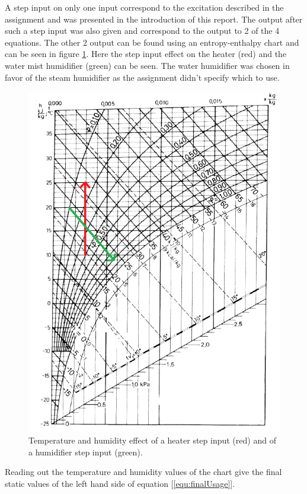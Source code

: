 \documentclass[a4paper, titlepage]{article}
\begin{document}
A step input on only one input correspond to the excitation described in the assignment and was presented in the introduction of this report.
The output after such a step input was also given and correspond to the output to 2 of the 4 equations.
The other 2 output can be found using an entropy-enthalpy chart and can be seen in figure \ref{fig:entropy}.
Here the step input effect on the heater (red) and the water mist humidifier (green) can be seen.
The water humidifier was chosen in favor of the steam humidifier as the assignment didn't specify which to use.

\begin{figure}
\center
\includegraphics[scale=0.7]{../figures/enthalpyEntropy.png}
\caption{Temperature and humidity effect of a heater step input (red) and of a humidifier step input (green).}
\label{fig:entropy}
\end{figure}

Reading out the temperature and humidity values of the chart give the final static values of the left hand side of equation [\ref{equ:finalUsage}].
\end{document}
